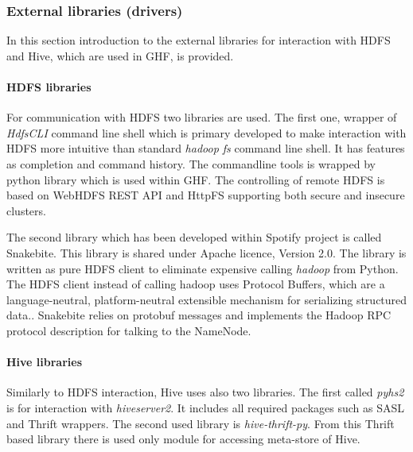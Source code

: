 \documentclass[a4paper,12pt,oneside]{report}
\begin{document}
	
	\subsubsection{External libraries (drivers)}
	In this section introduction to the external libraries for interaction with HDFS
	and Hive, which are used in GHF, is provided. 
	
	\paragraph{HDFS libraries}
	For communication with HDFS two libraries are used. The first one, wrapper of
	\textit{HdfsCLI} command line shell which is primary developed to make
	interaction with HDFS more intuitive than standard \textit{hadoop fs} command
	line shell. It has features as completion and command history.
	The commandline  tools is wrapped by python library which is used within GHF. The controlling of
	remote HDFS is based on WebHDFS REST API and HttpFS supporting both secure and
	insecure clusters.
	
	The second library which has been developed within Spotify project is called
	Snakebite. This library is shared under Apache licence, Version
	2.0. The library is written as pure HDFS client to eliminate expensive calling
	\textit{hadoop} from Python. The HDFS client instead of calling hadoop uses
	Protocol Buffers, which  are a language-neutral, platform-neutral extensible
	mechanism for serializing structured data.\cite{protobuf}. Snakebite relies on
	protobuf messages and implements the Hadoop RPC protocol description for talking
	to the NameNode.\cite{snakebite}
	
	\paragraph{Hive libraries}
	Similarly to HDFS interaction, Hive uses also two libraries. The first
	called \textit{pyhs2} is for interaction with \textit{hiveserver2}. It includes all
	required packages such as SASL and Thrift wrappers. The second used library is
	\textit{hive-thrift-py}. From this Thrift based library there is used only module for
	accessing meta-store of Hive.
	
\end{document}
